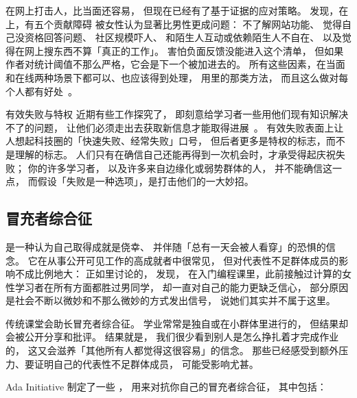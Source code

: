 在网上打击人，比当面还容易，
但现在已经有了基于证据的应对策略。
\cite{Ford2016}发现，在  上，有五个贡献障碍
被女性认为显著比男性更成问题：
不了解网站功能、
觉得自己没资格回答问题、
社区规模吓人、
和陌生人互动或依赖陌生人不自在、
以及觉得在网上搜东西不算「真正的工作」。
害怕负面反馈没能进入这个清单，
但如果作者对统计阈值不那么严格，它会是下一个被加进去的。
所有这些因素，在当面和在线两种场景下都可以、也应该得到处理，
用里的那类方法，
而且这么做对每个人都有好处~\cite{Sved2016}。

\begin{aside}{有效失败与特权}
  近期有些工作探究了，
  即刻意给学习者一些用他们现有知识解决不了的问题，
  让他们必须走出去获取新信息才能取得进展~\cite{Kapu2016}。
  有效失败表面上让人想起科技圈的「快速失败、经常失败」口号，
  但后者更多是特权的标志，而不是理解的标志。
  人们只有在确信自己还能再得到一次机会时，才承受得起庆祝失败；
  你的许多学习者，
  以及许多来自边缘化或弱势群体的人，
  并不能确信这一点，
  而假设「失败是一种选项」，是打击他们的一大妙招。
\end{aside}

\subsection*{冒充者综合征}

是一种认为自己取得成就是侥幸、
并伴随「总有一天会被人看穿」的恐惧的信念。
它在从事公开可见工作的高成就者中很常见，
但对代表性不足群体成员的影响不成比例地大：
正如里讨论的，
\cite{Wilc2018}发现，
在入门编程课里，此前接触过计算的女性学习者在所有方面都胜过男同学，
却一直对自己的能力更缺乏信心，
部分原因是社会不断以微妙和不那么微妙的方式发出信号，
说她们其实并不属于这里。

传统课堂会助长冒充者综合征。
学业常常是独自或在小群体里进行的，
但结果却会被公开分享和批评。
结果就是，
我们很少看到别人是怎么挣扎着才完成作业的，
这又会滋养「其他所有人都觉得这很容易」的信念。
那些已经感受到额外压力、要证明自己的代表性不足群体成员，
可能受影响尤甚。

Ada Initiative 制定了一些
，
用来对抗你自己的冒充者综合征，
其中包括：

